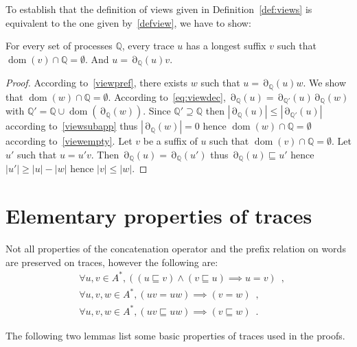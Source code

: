 \documentclass[a4paper,UKenglish]{lipics-v2016}
\newcommand{\QQ}{\mathbb{Q}}
\newcommand{\pref}{\sqsubseteq}
\DeclareMathOperator{\dom}{dom}
\DeclareMathOperator{\view}{\partial}
\begin{document}
To establish that the definition of views given in Definition~\ref{def:views} is equivalent
to the one given by~\eqref{defview},
we have to show:
\begin{lemma}
For every set of processes $\QQ$,
every trace $u$ has a longest suffix $v$ such that $\dom(v)\cap \QQ=\emptyset$.
And
$u=\view_\QQ(u)v$.
\end{lemma}
\begin{proof}
According to~\eqref{viewpref},
there exists $w$ such that $u=\view_\QQ(u)w$.
We show that
$\dom(w)\cap \QQ=\emptyset$.
According to~\eqref{eq:viewdec},
$\view_\QQ(u)=\view_{\QQ'}(u)\view_\QQ(w)$
with $\QQ'=\QQ\cup \dom(\view_\QQ(w))$.
Since $\QQ'\supseteq \QQ$
then
$|\view_\QQ(u)| \leq |\view_{\QQ'}(u)|$
according to~\eqref{viewsubapp}
thus $|\view_\QQ(w)|=0$ hence
$\dom(w)\cap \QQ=\emptyset$ according to~\eqref{viewempty}.
Let $v$ be a suffix of $u$
such that $\dom(v)\cap \QQ=\emptyset$.
Let $u'$ such that $u=u'v$. 
Then $\view_\QQ(u)=\view_\QQ(u')$
thus $\view_\QQ(u)\pref u'$ hence $|u'| \geq |u|-|w|$ hence $|v|\leq |w|$.
\end{proof}

\section{Elementary properties of traces}


Not all properties of the concatenation operator
and the prefix relation on words are preserved on traces,
however the following are:
\begin{align}
\label{eq:prefantisym}
&\forall u,v\in A^*, ((u\pref v) \land (v\pref u) \implies u=v)\enspace,\\
\label{eq:prefcancel}
&\forall u,v,w\in A^*, (uv=uw) \implies (v=w)\enspace,\\
&
\label{eq:preftrace}
\forall u,v,w\in A^*, (uv\pref uw)\implies(v\pref w)\enspace.
\end{align}

The following two lemmas list some basic properties of traces used in the proofs.
\end{document}
